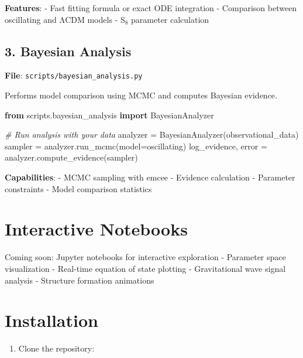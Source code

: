 \documentclass[
  11pt,
]{report}
\newenvironment{Shaded}{}{}
\newcommand{\CommentTok}[1]{\textcolor[rgb]{0.38,0.63,0.69}{\textit{#1}}}
\newcommand{\ImportTok}[1]{\textcolor[rgb]{0.00,0.50,0.00}{\textbf{#1}}}
\newcommand{\NormalTok}[1]{#1}
\newcommand{\OperatorTok}[1]{\textcolor[rgb]{0.40,0.40,0.40}{#1}}
\newcommand{\StringTok}[1]{\textcolor[rgb]{0.25,0.44,0.63}{#1}}
\providecommand{\tightlist}{%
  \setlength{\itemsep}{0pt}\setlength{\parskip}{0pt}}
\begin{document}
\textbf{Features}: - Fast fitting formula or exact ODE integration -
Comparison between oscillating and ΛCDM models - S\(_8\) parameter
calculation

\subsection{3. Bayesian Analysis}\label{bayesian-analysis}

\textbf{File}: \texttt{scripts/bayesian\_analysis.py}

Performs model comparison using MCMC and computes Bayesian evidence.

\begin{Shaded}
\begin{Highlighting}[]
\ImportTok{from}\NormalTok{ scripts.bayesian\_analysis }\ImportTok{import}\NormalTok{ BayesianAnalyzer}

\CommentTok{\# Run analysis with your data}
\NormalTok{analyzer }\OperatorTok{=}\NormalTok{ BayesianAnalyzer(observational\_data)}
\NormalTok{sampler }\OperatorTok{=}\NormalTok{ analyzer.run\_mcmc(model}\OperatorTok{=}\StringTok{\textquotesingle{}oscillating\textquotesingle{}}\NormalTok{)}
\NormalTok{log\_evidence, error }\OperatorTok{=}\NormalTok{ analyzer.compute\_evidence(sampler)}
\end{Highlighting}
\end{Shaded}

\textbf{Capabilities}: - MCMC sampling with emcee - Evidence calculation
- Parameter constraints - Model comparison statistics

\section{Interactive Notebooks}\label{interactive-notebooks}

Coming soon: Jupyter notebooks for interactive exploration - Parameter
space visualization - Real-time equation of state plotting -
Gravitational wave signal analysis - Structure formation animations

\section{Installation}\label{installation}

\begin{enumerate}
\def\labelenumi{\arabic{enumi}.}
\tightlist
\item
  Clone the repository:
\end{enumerate}
\end{document}

